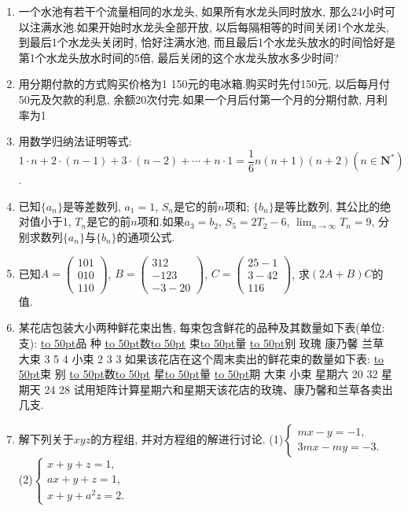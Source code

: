 \documentclass[10pt,a4paper]{article}
\newcommand{\blank}[1]{\underline{\hbox to #1pt{}}}
\begin{document}
\begin{enumerate}[1.]
\item 一个水池有若干个流量相同的水龙头, 如果所有水龙头同时放水, 那么24小时可以注满水池.如果开始时水龙头全部开放, 以后每隔相等的时间关闭1个水龙头, 到最后1个水龙头关闭时, 恰好注满水池, 而且最后1个水龙头放水的时间恰好是第1个水龙头放水时间的5倍, 最后关闭的这个水龙头放水多少时间?
\item 用分期付款的方式购买价格为1 150元的电冰箱.购买时先付150元, 以后每月付50元及欠款的利息, 余额20次付完.如果一个月后付第一个月的分期付款, 月利率为1%
\item 用数学归纳法证明等式:
$1\cdot n+2\cdot (n-1)+3\cdot (n-2)+\cdots +n\cdot 1=\dfrac 16n(n+1)(n+2)(n\in \mathbf{N}^*)$.
\item 已知$\{a_n\}$是等差数列, $a_1=1$, $S_n$是它的前$n$项和; $\{b_n\}$是等比数列, 其公比的绝对值小于1, $T_n$是它的前$n$项和.如果$a_3=b_2$, $S_5=2T_2-6$, $\displaystyle\lim_{n\to\infty}T_n=9$, 分别求数列$\{a_n\}$与$\{b_n\}$的通项公式.
\item 已知$A=\begin{pmatrix}
    1  0  1  \\0  1  0  \\1  1  0  \end{pmatrix}$, $B=\begin{pmatrix}
    3  1  2  \\-1  2  3  \\-3  -2  0  \end{pmatrix}$, $C=\begin{pmatrix}
    2  5  -1  \\3  -4  2  \\1  1  6  \end{pmatrix}$, 求$(2A+B)C$的值.
\item 某花店包装大小两种鲜花束出售, 每束包含鲜花的品种及其数量如下表(单位: 支):
\blank{50}品  种
\blank{50}数\blank{50}
束\blank{50}量
\blank{50}别	玫瑰	康乃馨	兰草
大束	3	5	4
小束	2	3	3
如果该花店在这个周末卖出的鲜花束的数量如下表:
\blank{50}束  别
\blank{50}数\blank{50}
星\blank{50}量
\blank{50}期	大束	小束
星期六	20	32
星期天	24	28
试用矩阵计算星期六和星期天该花店的玫瑰、康乃馨和兰草各卖出几支.
\item 解下列关于$xyz$的方程组, 并对方程组的解进行讨论.
(1)$\begin{cases}
    mx-y=-1,  \\3mx-my=-3.  \end{cases}$					(2)$\begin{cases}
    x+y+z=1,  \\ax+y+z=1,  \\x+y+a^2z=2.  \end{cases}$

\end{enumerate}
\end{document}
